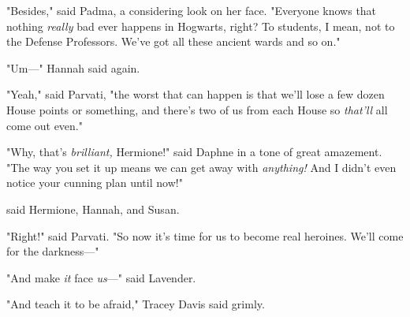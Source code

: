 "Besides," said Padma, a considering look on her face. "Everyone knows that
nothing \emph{really} bad ever happens in Hogwarts, right? To students, I mean,
not to the Defense Professors. We've got all these ancient wards and so on."

"Um\mbox{---}" Hannah said again.

"Yeah," said Parvati, "the worst that can happen is that we'll lose a few dozen
House points or something, and there's two of us from each House so
\emph{that'll} all come out even."

"Why, that's \emph{brilliant,} Hermione!" said Daphne in a tone of great
amazement. "The way you set it up means we can get away with \emph{anything!}
And I didn't even notice your cunning plan until now!"

 said Hermione, Hannah, and Susan.

"Right!" said Parvati. "So now it's time for us to become real heroines. We'll
come for the darkness\mbox{---}"

"And make \emph{it} face \emph{us}\mbox{---}" said Lavender.

"And teach it to be afraid," Tracey Davis said grimly.
